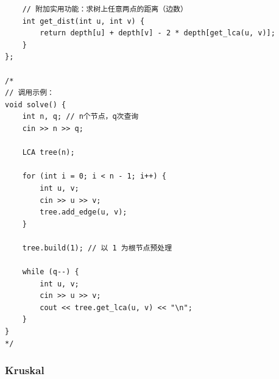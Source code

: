 \documentclass[10pt, a4paper, twocolumn]{article} %
\begin{document}
\begin{lstlisting}
    // 附加实用功能：求树上任意两点的距离（边数）
    int get_dist(int u, int v) {
        return depth[u] + depth[v] - 2 * depth[get_lca(u, v)];
    }
};

/*
// 调用示例：
void solve() {
    int n, q; // n个节点，q次查询
    cin >> n >> q;
    
    LCA tree(n);
    
    for (int i = 0; i < n - 1; i++) {
        int u, v;
        cin >> u >> v;
        tree.add_edge(u, v);
    }
    
    tree.build(1); // 以 1 为根节点预处理
    
    while (q--) {
        int u, v;
        cin >> u >> v;
        cout << tree.get_lca(u, v) << "\n";
    }
}
*/
    \end{lstlisting}
    \subsubsection{Kruskal}
\end{document}
